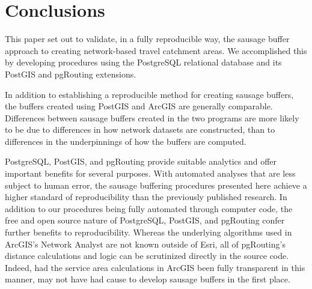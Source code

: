 \documentclass[11pt,letterpaper]{article} %
\begin{document}
\section*{Conclusions}
This paper set out to validate, in a fully reproducible way, the
sausage buffer approach to creating network-based travel catchment
areas. We accomplished this by developing procedures using the
PostgreSQL relational database and its PostGIS and pgRouting
extensions. 

In addition to establishing a reproducible method for creating sausage
buffers, the buffers created using PostGIS and ArcGIS 
are generally comparable. Differences between sausage buffers created in the two
programs are more likely to be due to differences in how network
datasets are constructed, than to differences in the underpinnings of how the buffers are
computed.

PostgreSQL, PostGIS, and pgRouting provide
suitable analytics and offer important benefits for several purposes.
With automated analyses that are less subject to human error, the sausage buffering procedures presented here achieve a higher
standard of reproducibility than the previously published research. In addition
to our procedures being fully automated through computer code, the
free and open source nature of PostgreSQL, PostGIS, and pgRouting
confer further benefits to reproducibility. Whereas the underlying algorithms used in ArcGIS's Network Analyst are not known outside of Esri,
all of pgRouting's distance calculations and logic can be scrutinized
directly in the source code. Indeed, had the service area calculations in ArcGIS been
fully transparent in this manner, \citeauthor{Forsyth2014sausage} may
not have had cause to develop sausage buffers in the first place.



\printbibliography
\end{document}
